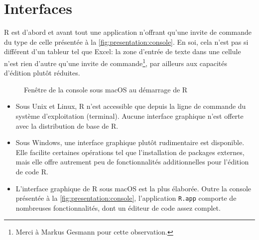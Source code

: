 \documentclass[11pt,article,french]{memoir}
\begin{document}
\section{Interfaces}
\label{sec:presentation:interfaces}

R est d'abord et avant tout une application n'offrant qu'une invite de
commande du type de celle présentée à la
\autoref{fig:presentation:console}. En soi, cela n'est pas si
différent d'un tableur tel que Excel: la zone d'entrée de texte dans
une cellule n'est rien d'autre qu'une invite de commande\footnote{%
  Merci à Markus Gesmann pour cette observation.}, par ailleurs aux
capacités d'édition plutôt réduites.

\begin{figure}
  \centering
  \caption{Fenêtre de la console sous macOS au démarrage de R}
  \label{fig:presentation:console}
\end{figure}

\begin{itemize}
\item Sous Unix et Linux, R n'est accessible que depuis la ligne de
  commande du système d'exploitation (terminal). Aucune interface
  graphique n'est offerte avec la distribution de base de R.
\item Sous Windows, une interface graphique plutôt rudimentaire est
  disponible. Elle facilite certaines opérations tel que
  l'installation de packages externes, mais elle offre autrement peu
  de fonctionnalités additionnelles pour l'édition de code R.
\item L'interface graphique de R sous macOS est la plus élaborée.
  Outre la console présentée à la
  \autoref{fig:presentation:console}, l'application \texttt{R.app}
  comporte de nombreuses fonctionnalités, dont un éditeur de code
  assez complet.
\end{itemize}
\end{document}

